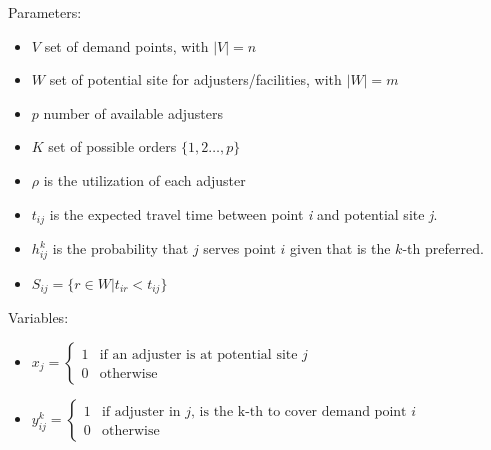 \begin{frame}
  Parameters:
  \begin{itemize}
  \item $V$ set of demand points, with $|V| = n$
  \item $W$ set of potential site for adjusters/facilities, with $|W| = m$
  \item $p$ number of available adjusters
  \item $K$  set of possible orders $\{1,2\ldots,p\}$
  \item $\rho$ is the utilization of each adjuster
  \item $t_{ij}$ is the expected travel time between point \textit{i} and potential site \textit{j}.
  \item $h_{ij}^{k}$ is the probability that $j$ serves point $i$ given that is the $k$-th preferred.
  \item $S_{ij} = \{r\in W | t_{ir} < t_{ij}\}$
  \end{itemize}
  
  Variables:
  \begin{itemize}
  \item $x_j =
    \begin{cases} 
      1 & \mbox{if an adjuster is at potential site } j \\
      0 & \mbox{otherwise}
    \end{cases}$
  \item $y_{ij}^k =
    \begin{cases} 
      1 & \mbox{if adjuster in } j \mbox{, is the k-th to cover demand point }i \\
      0 & \mbox{otherwise}
  \end{cases}$
  \end{itemize}
\end{frame}

